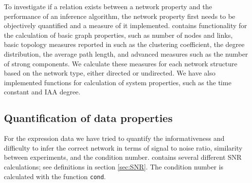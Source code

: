 To investigate if a relation exists between a network property and \eg the performance of an inference algorithm, the network property first needs to be objectively quantified and a measure of it implemented.
\gs contains functionality for the calculation of basic graph properties, such as number of nodes and links, basic topology measures reported in \citet{Prettejohn2011} such as the clustering coefficient, the degree distribution, the average path length, and advanced measures such as the number of strong components. We calculate these measures for each network structure based on the network type, either directed or undirected. We have also implemented functions for calculation of system properties, such as the time constant and IAA degree.


\subsection{Quantification of data properties}
\label{sec:quantification_data_properties}

For the expression data we have tried to quantify the informativeness and difficulty to infer the correct network in terms of signal to noise ratio, similarity between experiments, and the condition number.
\gs contains several different SNR calculations; see definitions in section \ref{sec:SNR}. The condition number is calculated with the \matlab function \texttt{cond}.